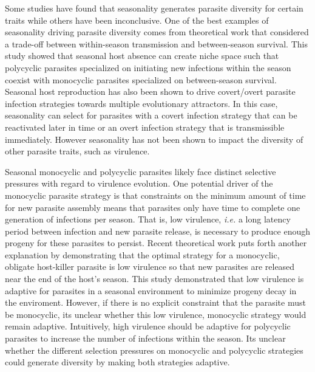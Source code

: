 \documentclass{article}
\begin{document}
Some studies have found that seasonality generates parasite diversity for certain traits while others have been inconclusive. One of the best examples of seasonality driving parasite diversity comes from theoretical work that considered a trade-off between within-season transmission and between-season survival\cite{hamelin2011seasonality}. This study showed that seasonal host absence can create niche space such that polycyclic parasites specialized on initiating new infections within the season coexist with monocyclic parasites specialized on between-season survival. %
Seasonal host reproduction has also been shown to drive covert/overt parasite infection strategies towards multiple evolutionary attractors\cite{sorrell2009evolution}. In this case, seasonality can select for parasites with a covert infection strategy that can be reactivated later in time or an overt infection strategy that is transmissible immediately. However seasonality has not been shown to impact the diversity of other parasite traits, such as virulence\cite{donnelly2013seasonality}.


Seasonal monocyclic and polycyclic parasites likely face distinct selective pressures with regard to virulence evolution. One potential driver of the monocyclic parasite strategy is that constraints on the minimum amount of time for new parasite assembly means that parasites only have time to complete one generation of infections per season. That is, low virulence, \textit{i.e.} a long latency period between infection and new parasite release, is necessary to produce enough progeny for these parasites to persist. Recent theoretical work puts forth another explanation by demonstrating that the optimal strategy for a monocyclic, obligate host-killer parasite is low virulence so that new parasites are released near the end of the host's season. This study demonstrated that low virulence is adaptive for parasites in a seasonal environment to minimize progeny decay in the enviroment. However, if there is no explicit constraint that the parasite must be monocyclic, its unclear whether this low virulence, monocyclic strategy would remain adaptive. Intuitively, high virulence should be adaptive for polycyclic parasites to increase the number of infections within the season. Its unclear whether the different selection pressures on monocyclic and polycyclic strategies could generate diversity by making both strategies adaptive.
\end{document}
